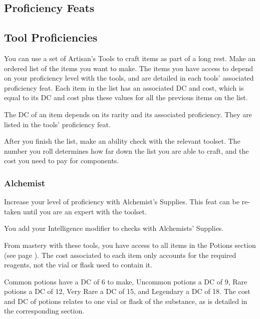 \subsection*{Proficiency Feats}

\subsection*{Tool Proficiencies}
    You can use a set of Artisan's Tools to craft items as part of a long rest.
    Make an ordered list of the items you want to make.
    The items you have access to depend on your proficiency level with the tools, and are detailed in each tools' associated proficiency feat.
    Each item in the list has an associated DC and cost, which is equal to its DC and cost plus these values for all the previous items on the list.

    The DC of an item depends on its rarity and its associated proficiency.
    They are listed in the tools' proficiency feat.

    After you finish the list, make an ability check with the relevant toolset.
    The number you roll determines how far down the list you are able to craft, and the cost you need to pay for components.

\subsubsection{Alchemist} \label{feat::alchemist}
    Increase your level of proficiency with Alchemist's Supplies.
    This feat can be re-taken until you are an expert with the toolset.

    You add your Intelligence modifier to checks with Alchemists' Supplies.

    From mastery with these tools, you have access to all items in the Potions section (see page \pageref{ssec::potions}).
    The cost associated to each item only accounts for the required reagents, not the vial or flask used to contain it.

    Common potions have a DC of 6 to make, Uncommon potions a DC of 9, Rare potions a DC of 12, Very Rare a DC of 15, and Legendary a DC of 18.
    The cost and DC of potions relates to one vial or flask of the substance, as is detailed in the corresponding section.
